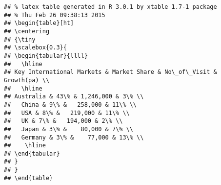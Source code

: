\documentclass{mbie-article}\usepackage[]{graphicx}\usepackage[]{color}
\makeatletter
\newenvironment{kframe}{%
 \def\at@end@of@kframe{}%
 \ifinner\ifhmode%
  \def\at@end@of@kframe{\end{minipage}}%
  \begin{minipage}{\columnwidth}%
 \fi\fi%
 \def\FrameCommand##1{\hskip\@totalleftmargin \hskip-\fboxsep
 \colorbox{shadecolor}{##1}\hskip-\fboxsep
     \hskip-\linewidth \hskip-\@totalleftmargin \hskip\columnwidth}%
 \MakeFramed {\advance\hsize-\width
   \@totalleftmargin\z@ \linewidth\hsize
   \@setminipage}}%
 {\par\unskip\endMakeFramed%
 \at@end@of@kframe}
\newenvironment{knitrout}{}{} %
\makeatother
\begin{document}



      




% 
% 
% 
     
      
\begin{knitrout}
\color{fgcolor}\begin{kframe}
\begin{verbatim}
## % latex table generated in R 3.0.1 by xtable 1.7-1 package
## % Thu Feb 26 09:38:13 2015
## \begin{table}[ht]
## \centering
## {\tiny
## \scalebox{0.3}{
## \begin{tabular}{llll}
##   \hline
## Key International Markets & Market Share & No\_of\_Visit & Growth(pa) \\ 
##   \hline
## Australia & 43\% & 1,246,000 & 3\% \\ 
##   China & 9\% &   258,000 & 11\% \\ 
##   USA & 8\% &   219,000 & 11\% \\ 
##   UK & 7\% &   194,000 & 2\% \\ 
##   Japan & 3\% &    80,000 & 7\% \\ 
##   Germany & 3\% &    77,000 & 13\% \\ 
##    \hline
## \end{tabular}
## }
## }
## \end{table}
\end{verbatim}
\end{kframe}
\end{knitrout}
\end{document}
